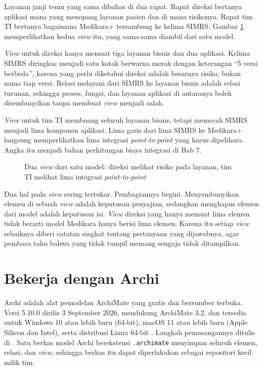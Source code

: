 \begin{kasus}[title={Kasus Medikara Health: View untuk Direksi dan View untuk Tim TI}]
  Layanan janji temu yang sama dibahas di dua rapat. Rapat direksi bertanya
  aplikasi mana yang menopang layanan pasien dan di mana risikonya. Rapat tim
  TI bertanya bagaimana Medikara+ tersambung ke kelima SIMRS. Gambar
  \ref{fig:ch04-dua-view} memperlihatkan kedua \textit{view} itu, yang
  sama-sama diambil dari satu model.

  \textit{View} untuk direksi hanya memuat tiga layanan bisnis dan dua
  aplikasi. Kelima SIMRS diringkas menjadi satu kotak berwarna merah dengan
  keterangan ``5 versi berbeda'', karena yang perlu diketahui direksi adalah
  besarnya risiko, bukan nama tiap versi. Relasi melayani dari SIMRS ke
  layanan bisnis adalah relasi turunan, sehingga proses, fungsi, dan layanan
  aplikasi di antaranya boleh disembunyikan tanpa membuat \textit{view}
  menjadi salah.

  \textit{View} untuk tim TI membuang seluruh layanan bisnis, tetapi
  memecah SIMRS menjadi lima komponen aplikasi. Lima garis dari lima SIMRS ke
  Medikara+ langsung memperlihatkan lima integrasi \textit{point-to-point}
  yang harus dipelihara. Angka itu menjadi bahan perhitungan biaya integrasi
  di Bab 7.
\end{kasus}

\begin{figure}[!htb]
  \centering
  
  \caption{Dua \textit{view} dari satu model: direksi melihat risiko pada
           layanan, tim TI melihat lima integrasi \textit{point-to-point}}
  \label{fig:ch04-dua-view}
\end{figure}

Dua hal pada \textit{view} sering tertukar. Pembagiannya begini.
Menyembunyikan elemen di sebuah \textit{view} adalah keputusan penyajian,
sedangkan menghapus elemen dari model adalah keputusan isi. \textit{View}
direksi yang hanya memuat lima elemen tidak berarti model Medikara hanya
berisi lima elemen. Karena itu setiap \textit{view} sebaiknya diberi catatan
singkat tentang pertanyaan yang dijawabnya, agar pembaca tahu bahwa yang
tidak tampil memang sengaja tidak ditampilkan.

\section{Bekerja dengan Archi}

Archi adalah alat pemodelan ArchiMate yang gratis dan bersumber terbuka.
Versi 5.10.0 dirilis 3 September 2026, mendukung ArchiMate 3.2, dan tersedia
untuk Windows 10 atau lebih baru (64-bit), macOS 11 atau lebih baru (Apple
Silicon dan Intel), serta distribusi Linux 64-bit \cite{archi}. Langkah
pemasangannya ditulis di .
Satu berkas model Archi berekstensi \texttt{.archimate} menyimpan seluruh
elemen, relasi, dan \textit{view}, sehingga berkas itu dapat diperlakukan
sebagai repositori kecil milik tim.

